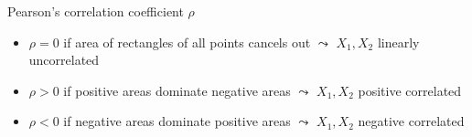 \documentclass[11pt,compress,t,notes=noshow, aspectratio=169, xcolor=table]{beamer}
\begin{document}
\begin{frame}{Pearson's correlation coefficient $\rho$}
\medskip
\pause
\begin{itemize}
    \item $\rho = 0$ if area of rectangles of all points cancels out
    $\leadsto$ $X_1, X_2$ linearly uncorrelated
    \item $\rho > 0$ if {\color{ggblue}positive areas} dominate {\color{ggred}negative areas} 
    $\leadsto$ $X_1, X_2$ positive correlated
    \item $\rho < 0$ if {\color{ggred}negative areas} dominate {\color{ggblue}positive areas} 
    $\leadsto$ $X_1, X_2$ negative correlated
\end{itemize}

\end{frame}
\end{document}
